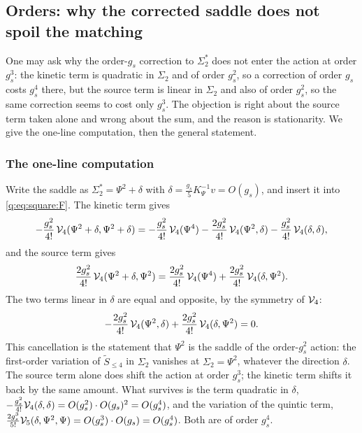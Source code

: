\subsection{Orders: why the corrected saddle does not spoil the matching}
\label{q:sec:orders}

One may ask why the order-$g_s$ correction to $\Sigma_2^*$ does not enter the action at order $g_s^3$: the kinetic term is quadratic in $\Sigma_2$ and of order $g_s^2$, so a correction of order $g_s$ costs $g_s^4$ there, but the source term is linear in $\Sigma_2$ and also of order $g_s^2$, so the same correction seems to cost only $g_s^3$.
The objection is right about the source term taken alone and wrong about the sum, and the reason is stationarity.
We give the one-line computation, then the general statement.

\subsubsection{The one-line computation}
\label{q:sec:orders:oneline}

Write the saddle as $\Sigma_2^*=\Psi^2+\delta$ with $\delta=\frac{g_s}{5}K_\Psi^{-1}v=O(g_s)$, and insert it into \eqref{q:eq:square:F}.
The kinetic term gives
\begin{equation}
  - \frac{g_s^2}{4!} \, {\mathcal{V}}_4(\Psi^2 + \delta, \Psi^2 + \delta)
    = - \frac{g_s^2}{4!} \, {\mathcal{V}}_4(\Psi^4)
      - \frac{2 g_s^2}{4!} \, {\mathcal{V}}_4(\Psi^2, \delta)
      - \frac{g_s^2}{4!} \, {\mathcal{V}}_4(\delta, \delta),
\end{equation}
and the source term gives
\begin{equation}
  \frac{2 g_s^2}{4!} \, {\mathcal{V}}_4(\Psi^2 + \delta, \Psi^2)
    = \frac{2 g_s^2}{4!} \, {\mathcal{V}}_4(\Psi^4)
      + \frac{2 g_s^2}{4!} \, {\mathcal{V}}_4(\delta, \Psi^2).
\end{equation}
The two terms linear in $\delta$ are equal and opposite, by the symmetry of ${\mathcal{V}}_4$:
\begin{equation}
  \label{q:eq:orders:cancel}
  - \frac{2 g_s^2}{4!} \, {\mathcal{V}}_4(\Psi^2, \delta)
    + \frac{2 g_s^2}{4!} \, {\mathcal{V}}_4(\delta, \Psi^2)
    = 0 .
\end{equation}
This cancellation is the statement that $\Psi^2$ is the saddle of the order-$g_s^2$ action: the first-order variation of $\widetilde S_{\le4}$ in $\Sigma_2$ vanishes at $\Sigma_2=\Psi^2$, whatever the direction $\delta$.
The source term alone does shift the action at order $g_s^3$; the kinetic term shifts it back by the same amount.
What survives is the term quadratic in $\delta$, $-\frac{g_s^2}{4!}{\mathcal{V}}_4(\delta,\delta)=O(g_s^2)\cdot O(g_s)^2=O(g_s^4)$, and the variation of the quintic term, $\frac{2g_s^3}{5!}{\mathcal{V}}_5(\delta,\Psi^2,\Psi)=O(g_s^3)\cdot O(g_s)=O(g_s^4)$.
Both are of order $g_s^4$.

